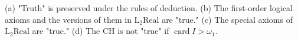 (a) "Truth" is preserved under the rules of deduction.
(b) The first-order logical axioms and the versions of them in $\mathrm{L}_2\mathrm{Real}$ are "true."
(c) The special axioms of $\mathrm{L}_2\mathrm{Real}$ are "true."
(d) The CH is not "true" if $\operatorname{card} I > \omega_1$.